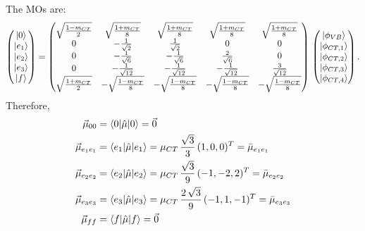 \documentclass[journal=jpcafh]{achemso}
\begin{document}
The MOs are:\begin{equation}
	\begin{pmatrix}
		\ket{0} \\ \ket{e_1} \\ \ket{e_2} \\ \ket{e_3} \\ \ket{f}
	\end{pmatrix} =
	\begin{pmatrix}
		\sqrt{\frac{1-m_{CT}}{2}}  & \sqrt{\frac{1+m_{CT}}{8}}  & \sqrt{\frac{1+m_{CT}}{8}}  & \sqrt{\frac{1+m_{CT}}{8}} & \sqrt{\frac{1+m_{CT}}{8}}\\
		0 & -\frac{1}{\sqrt{2}} & \frac{1}{\sqrt{2}} & 0 & 0\\
		0 & -\frac{1}{\sqrt{6}} &  -\frac{1}{\sqrt{6}} &  \frac{2}{\sqrt{6}} & 0 \\
		0 & -\frac{1}{\sqrt{12}} &  -\frac{1}{\sqrt{12}}&  -\frac{1}{\sqrt{12}} &  \frac{3}{\sqrt{12}}\\
		\sqrt{\frac{1+m_{CT}}{2}} & -\sqrt{\frac{1-m_{CT}}{8}}   & -\sqrt{\frac{1-m_{CT}}{8}}    & -\sqrt{\frac{1-m_{CT}}{8}}     & -\sqrt{\frac{1-m_{CT}}{8}} 
	\end{pmatrix} \,\begin{pmatrix}
		\ket{\phi_{VB}} \\ \ket{\phi_{CT,1}} \\ \ket{\phi_{CT,2}}\\ \ket{\phi_{CT,3}}\\ \ket{\phi_{CT,4}}
	\end{pmatrix}.
\end{equation}
Therefore,
\begin{align}
	\vec\mu_{00} &= \braket{0|\hat{\mu}|0} 
	= \vec 0 \\
	\vec\mu_{e_1e_1} &= \braket{e_1|\hat{\mu}|e_1} 
	= \mu_{CT}\,\frac{\sqrt{3}}{3}\,(1, 0, 0)^T  = \bar\mu_{e_1e_1}\\
	\vec\mu_{e_2e_2} &= \braket{e_2|\hat{\mu}|e_2} 
	= \mu_{CT}\,\frac{\sqrt{3}}{9}\,(-1, -2, 2)^T = \bar\mu_{e_2e_2}\\
	\vec\mu_{e_3e_3} &= \braket{e_3|\hat{\mu}|e_3} 
	= \mu_{CT}\,\frac{2\,\sqrt{3}}{9}\,(-1, 1, -1)^T  = \bar\mu_{e_3e_3}\\
	\vec\mu_{ff} &= \braket{f|\hat{\mu}|f} 
	= \vec{0}
\end{align}
\end{document}
